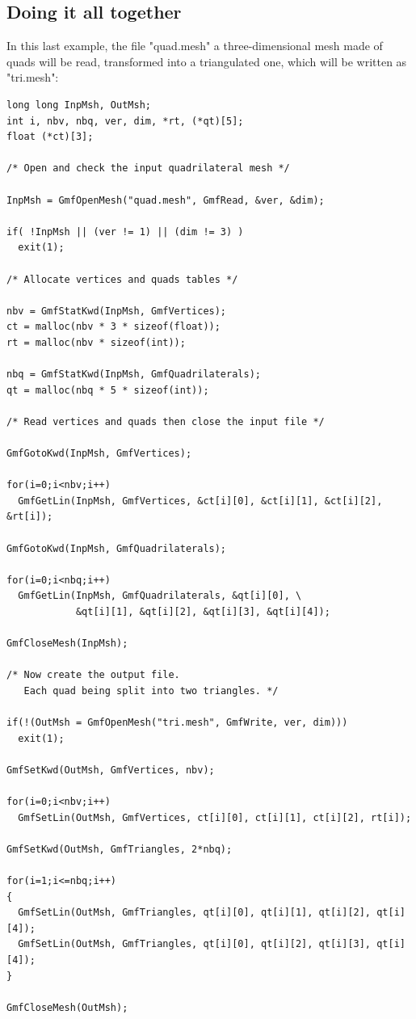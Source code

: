 \documentclass[a4paper,12pt]{article}
\begin{document}
\subsection{Doing it all together}

In this last example, the file "quad.mesh" a three-dimensional mesh made of quads will be read, transformed into a triangulated one, which will be written as "tri.mesh":

\begin{tt}
\begin{verbatim}
long long InpMsh, OutMsh;
int i, nbv, nbq, ver, dim, *rt, (*qt)[5];
float (*ct)[3];

/* Open and check the input quadrilateral mesh */

InpMsh = GmfOpenMesh("quad.mesh", GmfRead, &ver, &dim);

if( !InpMsh || (ver != 1) || (dim != 3) )
  exit(1);

/* Allocate vertices and quads tables */

nbv = GmfStatKwd(InpMsh, GmfVertices);
ct = malloc(nbv * 3 * sizeof(float));
rt = malloc(nbv * sizeof(int));

nbq = GmfStatKwd(InpMsh, GmfQuadrilaterals);
qt = malloc(nbq * 5 * sizeof(int));

/* Read vertices and quads then close the input file */

GmfGotoKwd(InpMsh, GmfVertices);

for(i=0;i<nbv;i++)
  GmfGetLin(InpMsh, GmfVertices, &ct[i][0], &ct[i][1], &ct[i][2], &rt[i]);

GmfGotoKwd(InpMsh, GmfQuadrilaterals);

for(i=0;i<nbq;i++)
  GmfGetLin(InpMsh, GmfQuadrilaterals, &qt[i][0], \
            &qt[i][1], &qt[i][2], &qt[i][3], &qt[i][4]);

GmfCloseMesh(InpMsh);

/* Now create the output file.
   Each quad being split into two triangles. */

if(!(OutMsh = GmfOpenMesh("tri.mesh", GmfWrite, ver, dim)))
  exit(1);

GmfSetKwd(OutMsh, GmfVertices, nbv);

for(i=0;i<nbv;i++)
  GmfSetLin(OutMsh, GmfVertices, ct[i][0], ct[i][1], ct[i][2], rt[i]);

GmfSetKwd(OutMsh, GmfTriangles, 2*nbq);

for(i=1;i<=nbq;i++)
{
  GmfSetLin(OutMsh, GmfTriangles, qt[i][0], qt[i][1], qt[i][2], qt[i][4]);
  GmfSetLin(OutMsh, GmfTriangles, qt[i][0], qt[i][2], qt[i][3], qt[i][4]);
}

GmfCloseMesh(OutMsh);
\end{verbatim}
\end{tt}
\normalfont
\end{document}
